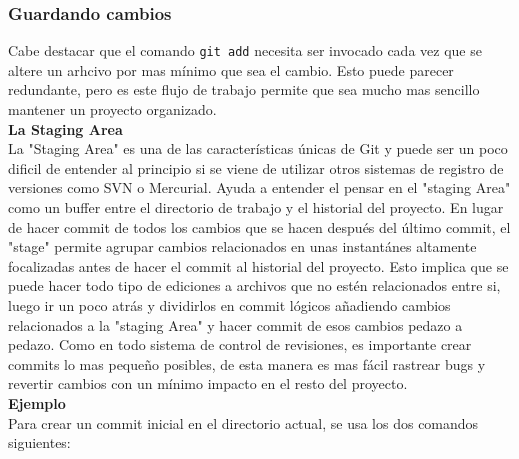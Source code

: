 \documentclass[8pt]{beamer}
\begin{document}
\begin{frame}
\frametitle{Guardando cambios}
Cabe destacar que el comando \texttt{git add} necesita ser invocado cada vez que se altere un arhcivo por mas m\'inimo que sea el cambio. Esto puede parecer redundante, pero es este flujo de trabajo permite que sea mucho mas sencillo mantener un proyecto organizado.\\
\medskip
\textbf{La Staging Area}\\
\medskip
La "Staging Area" es una de las caracter\'isticas \'unicas de Git y puede ser un poco dificil de entender al principio si se viene de utilizar otros sistemas de registro de versiones como SVN o Mercurial. Ayuda a entender el pensar en el "staging Area" como un buffer entre el directorio de trabajo y el historial del proyecto. En lugar de hacer commit de todos los cambios que se hacen despu\'es del \'ultimo commit, el "stage" permite agrupar cambios relacionados en unas instant\'anes altamente focalizadas antes de hacer el commit al historial del proyecto. Esto implica que se puede hacer todo tipo de ediciones a archivos que no est\'en relacionados entre si, luego ir un poco atr\'as y dividirlos en commit l\'ogicos a\~nadiendo cambios relacionados a la "staging Area"  y hacer commit de esos cambios pedazo a pedazo. Como en todo sistema de control de revisiones, es importante crear commits lo mas peque\~no posibles, de esta manera es mas f\'acil rastrear bugs y revertir cambios con un m\'inimo impacto en el resto del proyecto.\\
\medskip
\textbf{Ejemplo}\\
\medskip
Para crear un commit inicial en el directorio actual, se usa los dos comandos siguientes:


\end{frame}

\end{document}
